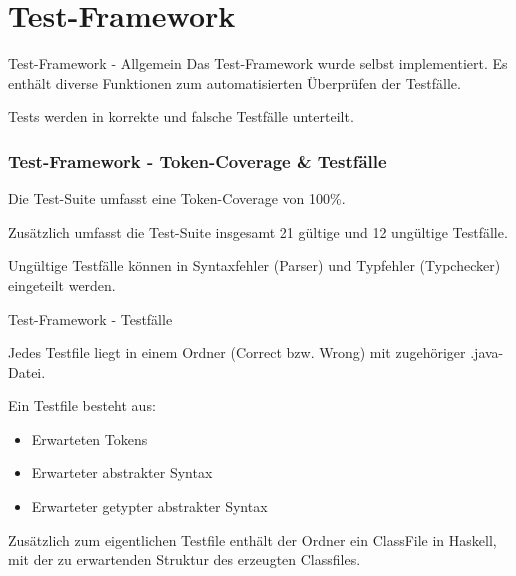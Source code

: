 \section{Test-Framework}

\begin{frame}{Test-Framework - Allgemein}
Das Test-Framework wurde selbst implementiert. Es enthält diverse Funktionen zum automatisierten Überprüfen der Testfälle.

\par \medskip

\pause

Tests werden in korrekte und falsche Testfälle unterteilt.


\end{frame}

\begin{frame}[fragile]
	\frametitle{Test-Framework - Token-Coverage \& Testfälle}
	
Die Test-Suite umfasst eine Token-Coverage von 100\%. 

\pause

\par \medskip

Zusätzlich umfasst die Test-Suite insgesamt 21 gültige und 12 ungültige Testfälle.

\pause

\par \medskip

Ungültige Testfälle können in Syntaxfehler (Parser) und Typfehler (Typchecker) eingeteilt werden.
\end{frame}

\begin{frame}{Test-Framework - Testfälle}

Jedes Testfile liegt in einem Ordner (Correct bzw. Wrong) mit zugehöriger .java-Datei. 	

\pause 

\par \medskip

Ein Testfile besteht aus: 

\begin{itemize}
	\item Erwarteten Tokens \pause 
	\item Erwarteter abstrakter Syntax \pause 
	\item Erwarteter getypter abstrakter Syntax \pause
\end{itemize}

Zusätzlich zum eigentlichen Testfile enthält der Ordner ein ClassFile in Haskell, mit der zu erwartenden Struktur des erzeugten Classfiles.
\end{frame}

